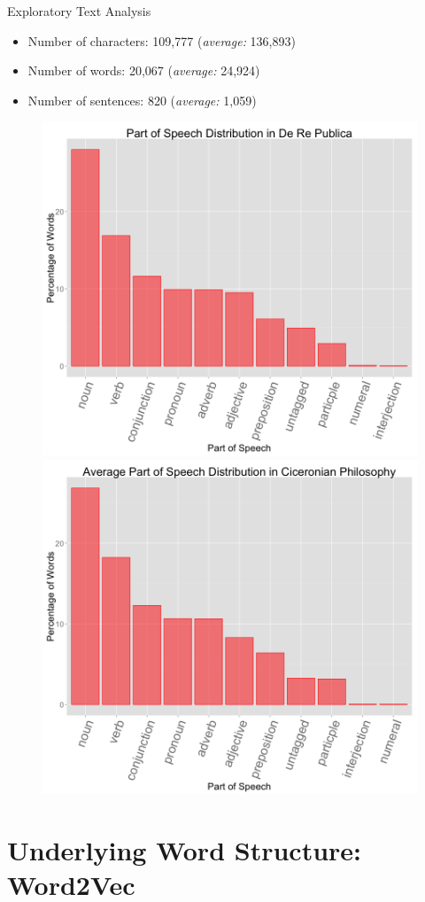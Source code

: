 \documentclass{beamer}
\begin{document}
\begin{frame}{Exploratory Text Analysis}
\begin{itemize}
	\item Number of characters: 109,777 \tab (\textit{average:} 136,893)
	\item Number of words: 20,067 \tab (\textit{average:} 24,924)
	\item Number of sentences: 820 \tab (\textit{average:} 1,059)
\end{itemize}



\begin{figure}
	\centering
	\begin{minipage}{.5\textwidth}
		\centering
		\includegraphics[scale=0.19]{fig1.png}
	\end{minipage}%
	\begin{minipage}{.5\textwidth}
		\centering
		\includegraphics[scale=0.19]{fig2.png}
	\end{minipage}
\end{figure}
\end{frame}

\section{Underlying Word Structure: Word2Vec}
\end{document}
